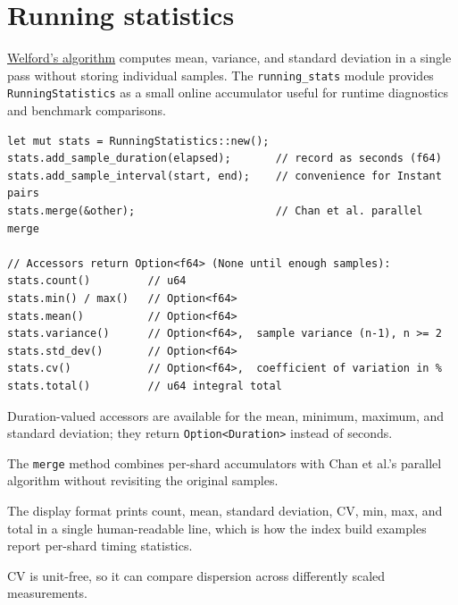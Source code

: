 \section{Running statistics}

\href{https://en.wikipedia.org/wiki/Algorithms_for_calculating_variance\#Welford's_online_algorithm}{Welford's
algorithm} computes mean, variance, and standard deviation in a single pass
without storing individual samples. The \texttt{running\_stats} module provides
\texttt{RunningStatistics} as a small online accumulator useful for runtime
diagnostics and benchmark comparisons.

\begin{lstlisting}[language={},caption={RunningStatistics use}]
let mut stats = RunningStatistics::new();
stats.add_sample_duration(elapsed);       // record as seconds (f64)
stats.add_sample_interval(start, end);    // convenience for Instant pairs
stats.merge(&other);                      // Chan et al. parallel merge

// Accessors return Option<f64> (None until enough samples):
stats.count()         // u64
stats.min() / max()   // Option<f64>
stats.mean()          // Option<f64>
stats.variance()      // Option<f64>,  sample variance (n-1), n >= 2
stats.std_dev()       // Option<f64>
stats.cv()            // Option<f64>,  coefficient of variation in %
stats.total()         // u64 integral total
\end{lstlisting}

Duration-valued accessors are available for the mean, minimum, maximum, and
standard deviation; they return \texttt{Option<Duration>} instead of seconds.

The \texttt{merge} method combines per-shard accumulators with Chan et al.'s
parallel algorithm without revisiting the original samples.

The display format prints count, mean, standard deviation, CV, min, max, and
total in a single human-readable line, which is how the index build examples
report per-shard timing statistics.

CV is unit-free, so it can compare dispersion across differently scaled
measurements.
